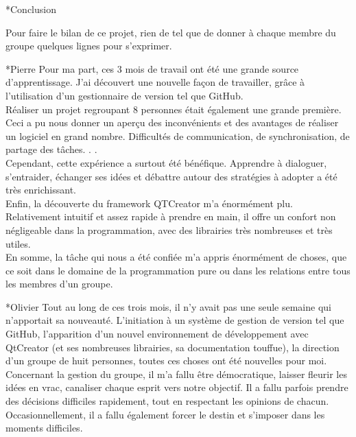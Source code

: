 \documentclass[a4paper, 12pt]{report}
\begin{document}
	\begin{chapter}*{Conclusion}
		Pour faire le bilan de ce projet, rien de tel que de donner à chaque membre du groupe quelques lignes pour s'exprimer.

		\begin{section}*{Pierre}
		Pour ma part, ces 3 mois de travail ont été une grande source d'apprentissage. J'ai découvert une nouvelle façon de travailler,
		grâce à l'utilisation d'un gestionnaire de version tel que GitHub.\\
		Réaliser un projet regroupant 8 personnes était également une grande première.
		Ceci a pu nous donner un aperçu des inconvénients et des avantages de réaliser un logiciel en grand nombre. Difficultés de communication,
		de synchronisation, de partage des tâches. . .\\
		Cependant, cette expérience a surtout été bénéfique. Apprendre à dialoguer, s'entraider, échanger ses
		idées et débattre autour des stratégies à adopter a été très enrichissant.\\
		Enfin, la découverte du framework QTCreator m'a énormément plu.
		Relativement intuitif et assez rapide à prendre en main, il offre un confort non négligeable dans la programmation,
	    avec des librairies très nombreuses et très utiles.\\
	    En somme, la tâche qui nous a été confiée m'a appris énormément de choses, que ce soit dans le domaine de la programmation pure ou dans les 
	    relations entre tous les membres d'un groupe.
		\end{section}

		\begin{section}*{Olivier}
		Tout au long de ces trois mois, il n'y avait pas une seule semaine qui n'apportait sa nouveauté. 
		L'initiation à un système de gestion de version tel que GitHub, l’apparition d'un nouvel environnement de développement avec QtCreator 
		(et ses nombreuses librairies, sa documentation touffue), la direction d'un groupe de huit personnes, toutes ces choses ont été nouvelles
		pour moi.\\

		Concernant la gestion du groupe, il m'a fallu être démocratique, laisser fleurir les idées en vrac, canaliser chaque esprit vers notre 
		objectif. Il a fallu parfois prendre des décisions difficiles rapidement, tout en respectant les opinions de chacun. Occasionnellement, il a
		fallu également forcer le destin et s'imposer dans les moments difficiles.\\


\end{section}
\end{chapter}
\end{document}
